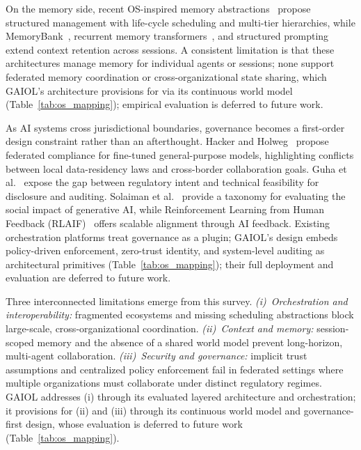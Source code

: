 \documentclass{iopjournal}
\begin{document}
On the memory side, recent OS-inspired memory abstractions~\cite{MemOS,MemoryOS} propose structured management with life-cycle scheduling and multi-tier hierarchies, while MemoryBank~\cite{MemoryBank_ACL23}, recurrent memory transformers~\cite{RecurrentMemory_NeurIPS23}, and structured prompting~\cite{LongContext_ICML24} extend context retention across sessions. A consistent limitation is that these architectures manage memory for individual agents or sessions; none support federated memory coordination or cross-organizational state sharing, which GAIOL's architecture provisions for via its continuous world model (Table~\ref{tab:os_mapping}); empirical evaluation is deferred to future work.

As AI systems cross jurisdictional boundaries, governance becomes a first-order design constraint rather than an afterthought. Hacker and Holweg~\cite{FineTuningReg} propose federated compliance for fine-tuned general-purpose models, highlighting conflicts between local data-residency laws and cross-border collaboration goals. Guha et al.~\cite{FM_Governance} expose the gap between regulatory intent and technical feasibility for disclosure and auditing. Solaiman et al.~\cite{SafetyTaxonomy_FAccT23} provide a taxonomy for evaluating the social impact of generative AI, while Reinforcement Learning from Human Feedback (RLAIF)~\cite{RLAIF_NeurIPS23} offers scalable alignment through AI feedback. Existing orchestration platforms treat governance as a plugin; GAIOL's design embeds policy-driven enforcement, zero-trust identity, and system-level auditing as architectural primitives (Table~\ref{tab:os_mapping}); their full deployment and evaluation are deferred to future work.

Three interconnected limitations emerge from this survey. \emph{(i)~Orchestration and interoperability:} fragmented ecosystems and missing scheduling abstractions block large-scale, cross-organizational coordination. \emph{(ii)~Context and memory:} session-scoped memory and the absence of a shared world model prevent long-horizon, multi-agent collaboration. \emph{(iii)~Security and governance:} implicit trust assumptions and centralized policy enforcement fail in federated settings where multiple organizations must collaborate under distinct regulatory regimes. GAIOL addresses (i) through its evaluated layered architecture and orchestration; it provisions for (ii) and (iii) through its continuous world model and governance-first design, whose evaluation is deferred to future work (Table~\ref{tab:os_mapping}).
\end{document}
